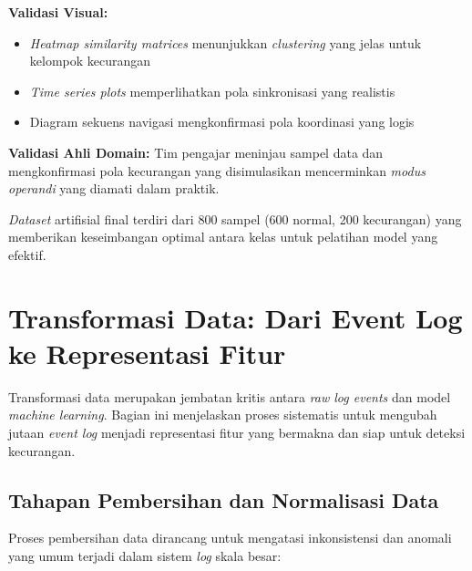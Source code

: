 \textbf{Validasi Visual:}
\begin{itemize}
    \item \textit{Heatmap similarity matrices} menunjukkan \textit{clustering} yang jelas untuk kelompok kecurangan
    \item \textit{Time series plots} memperlihatkan pola sinkronisasi yang realistis
    \item Diagram sekuens navigasi mengkonfirmasi pola koordinasi yang logis
\end{itemize}

\textbf{Validasi Ahli Domain:}
Tim pengajar meninjau sampel data dan mengkonfirmasi pola kecurangan yang disimulasikan mencerminkan \textit{modus operandi} yang diamati dalam praktik.

\textit{Dataset} artifisial final terdiri dari 800 sampel (600 normal, 200 kecurangan) yang memberikan keseimbangan optimal antara kelas untuk pelatihan model yang efektif.

\section{Transformasi Data: Dari Event Log ke Representasi Fitur}
\label{sec:transformasiData}

Transformasi data merupakan jembatan kritis antara \textit{raw log events} dan model \textit{machine learning}. Bagian ini menjelaskan proses sistematis untuk mengubah jutaan \textit{event log} menjadi representasi fitur yang bermakna dan siap untuk deteksi kecurangan.

\subsection{Tahapan Pembersihan dan Normalisasi Data}
\label{sec:pembersihanNormalisasi}

Proses pembersihan data dirancang untuk mengatasi inkonsistensi dan anomali yang umum terjadi dalam sistem \textit{log} skala besar:

